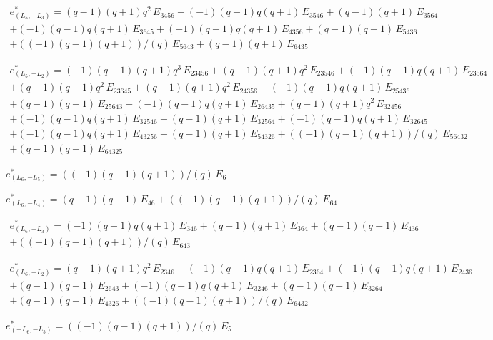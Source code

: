 \begin{multline*}
e^*_{(L_5, -L_3)} = 
  (q-1)(q+1)q^2\,E_{3456} + (-1)(q-1)q(q+1)\,E_{3546} + (q-1)(q+1)\,E_{3564}
  \\
  + (-1)(q-1)q(q+1)\,E_{3645} + (-1)(q-1)q(q+1)\,E_{4356} + (q-1)(q+1)\,E_{5436}
  \\
  + ((-1)(q-1)(q+1))/(q)\,E_{5643} + (q-1)(q+1)\,E_{6435}
\end{multline*}

\begin{multline*}
e^*_{(L_5, -L_2)} = 
  (-1)(q-1)(q+1)q^3\,E_{23456} + (q-1)(q+1)q^2\,E_{23546} + (-1)(q-1)q(q+1)\,E_{23564}
  \\
  + (q-1)(q+1)q^2\,E_{23645} + (q-1)(q+1)q^2\,E_{24356} + (-1)(q-1)q(q+1)\,E_{25436}
  \\
  + (q-1)(q+1)\,E_{25643} + (-1)(q-1)q(q+1)\,E_{26435} + (q-1)(q+1)q^2\,E_{32456}
  \\
  + (-1)(q-1)q(q+1)\,E_{32546} + (q-1)(q+1)\,E_{32564} + (-1)(q-1)q(q+1)\,E_{32645}
  \\
  + (-1)(q-1)q(q+1)\,E_{43256} + (q-1)(q+1)\,E_{54326} + ((-1)(q-1)(q+1))/(q)\,E_{56432}
  \\
  + (q-1)(q+1)\,E_{64325}
\end{multline*}

$e^*_{(L_6, -L_5)} = ((-1)(q-1)(q+1))/(q)\,E_{6}$

$e^*_{(L_6, -L_4)} = (q-1)(q+1)\,E_{46} + ((-1)(q-1)(q+1))/(q)\,E_{64}$

\begin{multline*}
e^*_{(L_6, -L_3)} = 
  (-1)(q-1)q(q+1)\,E_{346} + (q-1)(q+1)\,E_{364} + (q-1)(q+1)\,E_{436}
  \\
  + ((-1)(q-1)(q+1))/(q)\,E_{643}
\end{multline*}

\begin{multline*}
e^*_{(L_6, -L_2)} = 
  (q-1)(q+1)q^2\,E_{2346} + (-1)(q-1)q(q+1)\,E_{2364} + (-1)(q-1)q(q+1)\,E_{2436}
  \\
  + (q-1)(q+1)\,E_{2643} + (-1)(q-1)q(q+1)\,E_{3246} + (q-1)(q+1)\,E_{3264}
  \\
  + (q-1)(q+1)\,E_{4326} + ((-1)(q-1)(q+1))/(q)\,E_{6432}
\end{multline*}

$e^*_{(-L_6, -L_5)} = ((-1)(q-1)(q+1))/(q)\,E_{5}$

